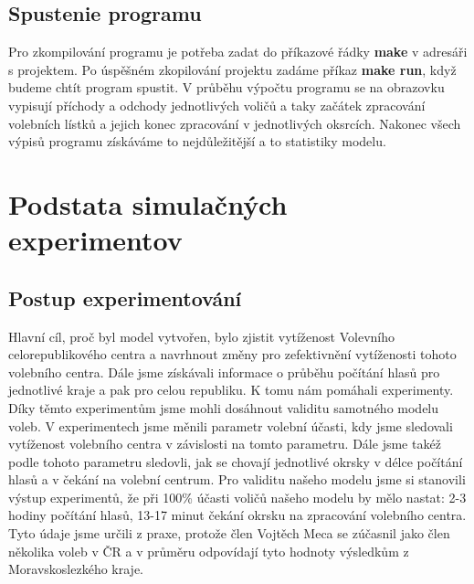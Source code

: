 \documentclass[12pt,a4paper,titlepage,final]{article}
\begin{document}
\subsection{Spustenie programu}
Pro zkompilování programu je potřeba zadat do příkazové řádky \textbf{make} v adresáři s projektem. Po úspěšném zkopilování projektu zadáme příkaz \textbf{make run}, když budeme chtít program spustit. V průběhu výpočtu programu se na obrazovku vypisují příchody a odchody jednotlivých voličů a taky začátek zpracování volebních lístků a jejich konec zpracování v jednotlivých oksrcích. Nakonec všech výpisů programu získáváme to nejdůležitější a to statistiky modelu.
\newpage


\section{Podstata simulačných experimentov}
\subsection{Postup experimentování}
Hlavní cíl, proč byl model vytvořen, bylo zjistit vytíženost Volevního celorepublikového centra a navrhnout změny pro zefektivnění vytíženosti tohoto volebního centra. Dále jsme získávali informace o průběhu počítání hlasů pro jednotlivé kraje a pak pro celou republiku. K tomu nám pomáhali experimenty. Díky těmto experimentům jsme mohli dosáhnout validitu samotného modelu voleb. V experimentech jsme měnili parametr volební účasti, kdy jsme sledovali vytíženost volebního centra v závislosti na tomto parametru. Dále jsme takéž podle tohoto parametru sledovli, jak se chovají jednotlivé okrsky v délce počítání hlasů a v čekání na volební centrum. \newline
Pro validitu našeho modelu jsme si stanovili výstup experimentů, že při 100\% účasti voličů našeho modelu by mělo nastat: 2-3 hodiny počítání hlasů, 13-17 minut čekání okrsku na zpracování volebního centra. Tyto údaje jsme určili z praxe, protože člen Vojtěch Meca se zúčasnil jako člen několika voleb v ČR a v průměru odpovídají tyto hodnoty výsledkům z Moravskoslezkého kraje.
  
\end{document}
